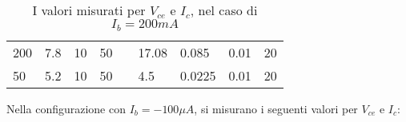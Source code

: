 \documentclass{article}
\begin{document}
\begin{table}[H]
\begin{tabular}{|l|l|l|l|l|l|l|l|l|}
        200           & 7.8                       & 10                        & 50                        &  & 17.08      & 0.085                     & 0.01                      & 20                        \\ \cline{1-4} \cline{6-9}
        50            & 5.2                       & 10                        & 50                        &  & 4.5        & 0.0225                    & 0.01                      & 20                        \\ \cline{1-4} \cline{6-9}
    \end{tabular}
    \caption{I valori misurati per $V_{ce}$ e $I_c$, nel caso di $I_b=200 mA$}\label{Tabella 1}
    \medskip
\end{table}

Nella configurazione con $I_b=-100\mu A$, si misurano i seguenti valori per $V_{ce}$ e $I_c$:
\end{document}
